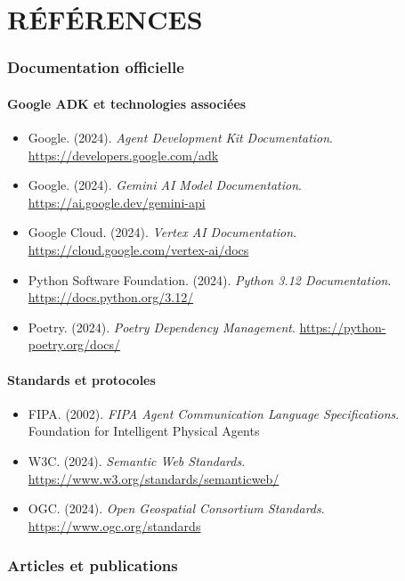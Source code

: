 \chapter*{RÉFÉRENCES}

\subsection{Documentation officielle}

\subsubsection{Google ADK et technologies associées}
\begin{itemize}
    \item Google. (2024). \textit{Agent Development Kit Documentation}. \url{https://developers.google.com/adk}
    \item Google. (2024). \textit{Gemini AI Model Documentation}. \url{https://ai.google.dev/gemini-api}
    \item Google Cloud. (2024). \textit{Vertex AI Documentation}. \url{https://cloud.google.com/vertex-ai/docs}
    \item Python Software Foundation. (2024). \textit{Python 3.12 Documentation}. \url{https://docs.python.org/3.12/}
    \item Poetry. (2024). \textit{Poetry Dependency Management}. \url{https://python-poetry.org/docs/}
\end{itemize}

\subsubsection{Standards et protocoles}
\begin{itemize}
    \item FIPA. (2002). \textit{FIPA Agent Communication Language Specifications}. Foundation for Intelligent Physical Agents
    \item W3C. (2024). \textit{Semantic Web Standards}. \url{https://www.w3.org/standards/semanticweb/}
    \item OGC. (2024). \textit{Open Geospatial Consortium Standards}. \url{https://www.ogc.org/standards}
\end{itemize}

\subsection{Articles et publications}

